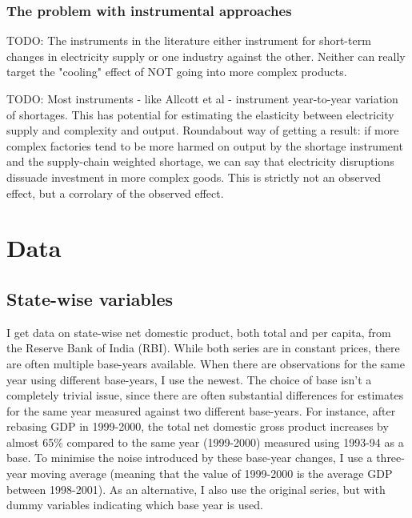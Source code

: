 \documentclass[11pt]{article}
\begin{document}
\subsubsection{The problem with instrumental approaches}
\label{sec:orge917ac0}

TODO: The instruments in the literature either instrument for short-term changes in electricity supply or one industry against the other. Neither can really target the "cooling" effect of NOT going into more complex products.

TODO: Most instruments - like Allcott et al - instrument year-to-year variation of shortages. This has potential for estimating the elasticity between electricity supply and complexity and output. Roundabout way of getting a result: if more complex factories tend to be more harmed on output by the shortage instrument and the supply-chain weighted shortage, we can say that electricity disruptions dissuade investment in more complex goods. This is strictly not an observed effect, but a corrolary of the observed effect.

\section{Data}%
\label{sub:data}

\subsection{State-wise variables}%
\label{sub:state_wise_variables}

I get data on state-wise net domestic product, both total and per capita, from the Reserve Bank of India (RBI). While both series are in constant prices, there are often multiple base-years available. When there are observations for the same year using different base-years, I use the newest. The choice of base isn't a completely trivial issue, since there are often substantial differences for estimates for the same year measured against two different base-years. For instance, after rebasing GDP in 1999-2000, the total net domestic gross product increases by almost 65\% compared to the same year (1999-2000) measured using 1993-94 as a base. To minimise the noise introduced by these base-year changes, I use a three-year moving average (meaning that the value of 1999-2000 is the average GDP between 1998-2001). As an alternative, I also use the original series, but with dummy variables indicating which base year is used.
\end{document}
